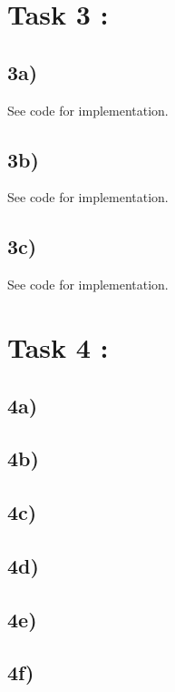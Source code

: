\documentclass{article}
\begin{document}
\section*{Task 3 :}

\subsection*{3a)}
See code for implementation.
\subsection*{3b)}
See code for implementation.
\subsection*{3c)}
See code for implementation.






\section*{Task 4 : }

\subsection*{4a)}


\subsection*{4b)}

\subsection*{4c)}

\subsection*{4d)}
    
\subsection*{4e)}

\subsection*{4f)}
\end{document}
